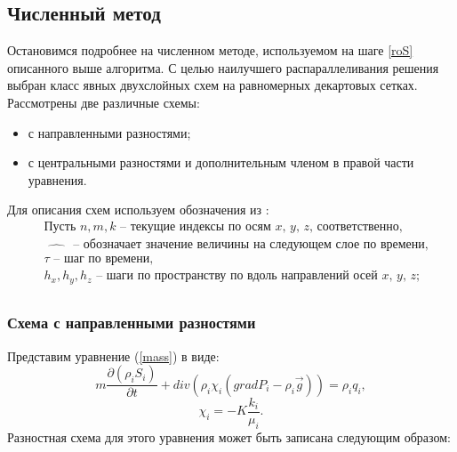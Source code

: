 \subsection{Численный метод}
Остановимся подробнее на численном методе, используемом на шаге \ref{roS}
описанного выше алгоритма. С целью наилучшего распараллеливания решения 
выбран класс явных двухслойных схем на равномерных декартовых сетках.
Рассмотрены две различные схемы:
\begin{itemize}
\item с направленными разностями;
\item с центральными разностями и дополнительным членом в правой части уравнения.
\end{itemize}
Для описания схем используем обозначения из \cite{Kalitkin}:
\begin{equation*}
  \begin{aligned}
    &\text{Пусть } n, m, k \text{ -- текущие индексы по осям $x$, $y$, $z$, соответственно,}\\
    &\widehat{\qquad} \text{ -- обозначает значение величины на следующем слое по времени,}\\
    &\tau \text{ -- шаг по времени,}\\
    &h_x, h_y, h_z \text{ -- шаги по пространству по 
    вдоль направлений осей $x$, $y$, $z$};\\
  \end{aligned}
\end{equation*}


\subsubsection{Схема с направленными разностями}
Представим уравнение (\ref{mass}) в виде:
 \begin{equation}
 	 m \frac{\partial (\rho_i S_i)}{\partial t}+ div(\rho_i \chi_i (grad P_i - {\rho}_i\overrightarrow{g})) = \rho_i q_i,
 \end{equation}
 $$\chi_i=-K\frac{k_i}{\mu_i}.$$
Разностная схема для этого уравнения может быть записана следующим
образом:

